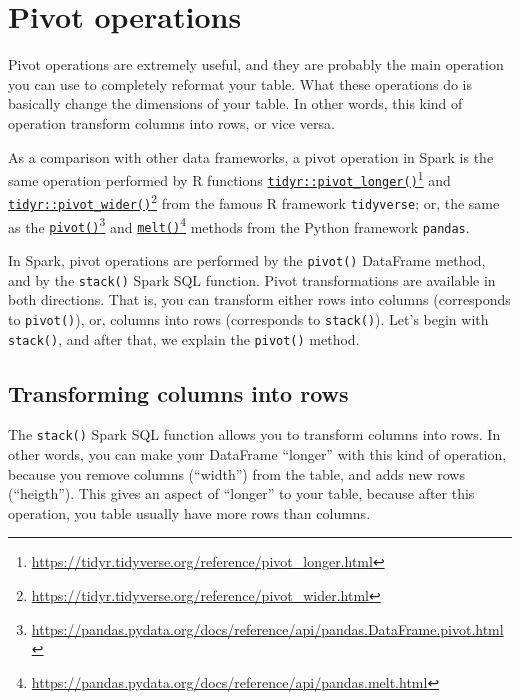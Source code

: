 \documentclass[
  11pt,
  letterpaper,
  DIV=11,
  numbers=noendperiod]{scrreprt}
\begin{document}
\section{Pivot operations}\label{pivot-operations}

Pivot operations are extremely useful, and they are probably the main
operation you can use to completely reformat your table. What these
operations do is basically change the dimensions of your table. In other
words, this kind of operation transform columns into rows, or vice
versa.

As a comparison with other data frameworks, a pivot operation in Spark
is the same operation performed by R functions
\href{https://tidyr.tidyverse.org/reference/pivot_longer.html}{\texttt{tidyr::pivot\_longer()}}\footnote{\url{https://tidyr.tidyverse.org/reference/pivot_longer.html}}
and
\href{https://tidyr.tidyverse.org/reference/pivot_wider.html}{\texttt{tidyr::pivot\_wider()}}\footnote{\url{https://tidyr.tidyverse.org/reference/pivot_wider.html}}
from the famous R framework \texttt{tidyverse}; or, the same as the
\href{https://pandas.pydata.org/docs/reference/api/pandas.DataFrame.pivot.html}{\texttt{pivot()}}\footnote{\url{https://pandas.pydata.org/docs/reference/api/pandas.DataFrame.pivot.html}}
and
\href{https://pandas.pydata.org/docs/reference/api/pandas.melt.html}{\texttt{melt()}}\footnote{\url{https://pandas.pydata.org/docs/reference/api/pandas.melt.html}}
methods from the Python framework \texttt{pandas}.

In Spark, pivot operations are performed by the \texttt{pivot()}
DataFrame method, and by the \texttt{stack()} Spark SQL function. Pivot
transformations are available in both directions. That is, you can
transform either rows into columns (corresponds to \texttt{pivot()}),
or, columns into rows (corresponds to \texttt{stack()}). Let's begin
with \texttt{stack()}, and after that, we explain the \texttt{pivot()}
method.

\subsection{Transforming columns into
rows}\label{transforming-columns-into-rows}

The \texttt{stack()} Spark SQL function allows you to transform columns
into rows. In other words, you can make your DataFrame ``longer'' with
this kind of operation, because you remove columns (``width'') from the
table, and adds new rows (``heigth''). This gives an aspect of
``longer'' to your table, because after this operation, you table
usually have more rows than columns.
\end{document}
